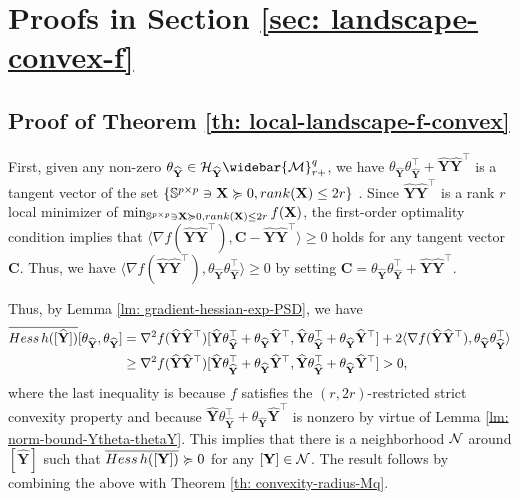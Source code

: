 \documentclass[11pt]{article}
\newcommand{\bbS}{\mathbb{S}}
\newcommand{\cH}{\mathcal{H}}
\newcommand{\0}{{\mathbf{0}}}
\newcommand{\1}{{\mathbf{1}}}
\newcommand{\X}{{\mathbf{X}}}
\newcommand{\C}{{\mathbf{C}}}
\newcommand{\Y}{{\mathbf{Y}}}
\newcommand{\cN}{{\cal N}}
\newcommand{\cM}{{\cal M}}
\newcommand{\rank}{{\rm rank}}
\newcommand{\Hess}{{\rm Hess}}
\newcommand{\nc}{\normalcolor}
\begin{document}
\section{Proofs in Section \ref{sec: landscape-convex-f} } \label{proof-sec: h-landscape-f-convex}
\subsection{Proof of Theorem \ref{th: local-landscape-f-convex}}

	First, given any non-zero $\theta_{\widehat{\Y}} \in \cH_{ \widehat{\Y} } \widebar{\cM}_{r+}^q$, we have $\theta_{\widehat{\Y}} \theta_{\widehat{\Y}}^\top + \widehat{\Y} \widehat{\Y}^\top$ is a tangent vector of the set $\{ \bbS^{p \times p} \ni \X \succcurlyeq 0 , \rank(\X) \leq 2r  \}$ \cite[Chapter 6]{rockafellar2009variational}. Since $\widehat{\Y} \widehat{\Y}^\top$ is a rank $r$ local minimizer of $\min_{\bbS^{p \times p} \ni \X \succcurlyeq 0 , \rank(\X) \leq 2r  } f(\X)$, the first-order optimality condition implies that $ \langle  \nabla f(\widehat{\Y} \widehat{\Y}^\top ) , \C - \widehat{\Y} \widehat{\Y}^\top \rangle \geq 0 $ holds for any tangent vector $\C$. Thus, we have $ \langle  \nabla f(\widehat{\Y} \widehat{\Y}^\top ) ,  \theta_{\widehat{\Y}} \theta_{\widehat{\Y}}^\top \rangle \geq 0 $ by setting $\C =\theta_{\widehat{\Y}} \theta_{\widehat{\Y}}^\top + \widehat{\Y} \widehat{\Y}^\top$.
	
	Thus, by Lemma \ref{lm: gradient-hessian-exp-PSD}, we have
	\begin{equation*}
		\begin{split}
			\overline{\Hess \, h([\widehat{\Y}])}[\theta_{\widehat{\Y}}, \theta_{\widehat{\Y}}] & = \nabla^2 f(\widehat{\Y} \widehat{\Y}^\top)[\widehat{\Y}\theta_{\widehat{\Y}}^\top + \theta_{\widehat{\Y}} \widehat{\Y}^\top , \widehat{\Y} \theta_{\widehat{\Y}}^\top + \theta_{\widehat{\Y}} \widehat{\Y}^\top ] + 2\langle \nabla f(\widehat{\Y} \widehat{\Y}^\top ), \theta_{\widehat{\Y}} \theta_{\widehat{\Y}}^\top \rangle \\
			& \geq \nabla^2 f(\widehat{\Y} \widehat{\Y}^\top)[\widehat{\Y}\theta_{\widehat{\Y}}^\top + \theta_{\widehat{\Y}} \widehat{\Y}^\top , \widehat{\Y}\theta_{\widehat{\Y}}^\top + \theta_{\widehat{\Y}}\widehat{\Y}^\top ] > 0,
		\end{split}
	\end{equation*} where the last inequality is because $f$ satisfies the $(r,2r)$-restricted strict convexity property and because $\widehat{\Y}\theta_{\widehat{\Y}}^\top + \theta_{\widehat{\Y}} \widehat{\Y}^\top$ is nonzero by virtue of Lemma \ref{lm: norm-bound-Ytheta-thetaY}\nc. This implies that there is a neighborhood $\cN$ around $[\widehat{\Y}]$ such that $\overline{\Hess \, h([\Y])} \succcurlyeq 0$ for any $[\Y] \in \cN$. The result follows by combining the above with Theorem \ref{th: convexity-radius-Mq}. 
\end{document}
